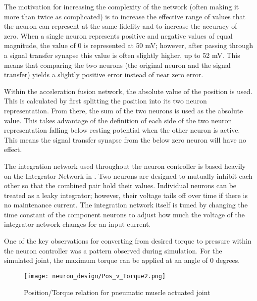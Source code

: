 The motivation for increasing the complexity of the
network (often making it more than twice as complicated) is to increase the
effective range of values that the neuron can represent at the same fidelity and
to increase the accuracy of zero. When a single neuron represents positive and
negative values of equal magnitude, the value of 0 is represented at 50 mV; 
however, after passing through a signal transfer synapse this value is often
slightly higher, up to 52 mV. This means that comparing the two neurons (the
original neuron and the signal transfer) yields a slightly positive error
instead of near zero error.



Within the acceleration fusion network, the absolute value of the position is
used. This is calculated by first splitting the position into its two neuron
representation. From there, the sum of the two neurons is used as the absolute
value. This takes advantage of the definition of each side of the two neuron
representation falling below resting potential when the other neuron is active.
This means the signal transfer synapse from the below zero neuron will have no
effect.



The integration network used throughout the neuron controller is based heavily
on the Integrator Network in \cite{NickFunctionalSubnetwork}. Two neurons are
designed to mutually inhibit each other so that the combined pair hold their
values. Individual neurons can be treated as a leaky integrator; however, their
voltage tails off over time if there is no maintenance current. The integration
network itself is tuned by changing the time constant of the component neurons
to adjust how much the voltage of the integrator network changes for an input
current.


One of the key observations for converting from desired torque to pressure 
within the neuron controller was a pattern observed during simulation. For the
simulated joint, the maximum torque can be applied at an angle of 0 degrees.

\begin{figure}[h!]
\centering
\texttt{[image: neuron\_design/Pos\_v\_Torque2.png]}
\caption{Position/Torque relation for pneumatic muscle actuated joint}
\label{fig:PositionTorque}
\end{figure}

